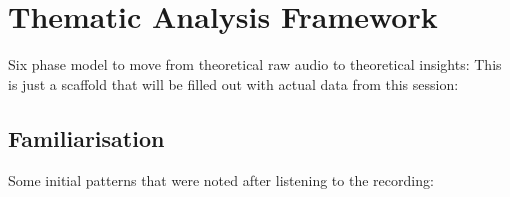 
\section{Thematic Analysis Framework}
Six phase model to move from theoretical raw audio to theoretical insights:
This is just a scaffold that will be filled out with actual data from this session:


    

    

    

    

    

    



\subsection{Familiarisation}

Some initial patterns that were noted after listening to the recording:

